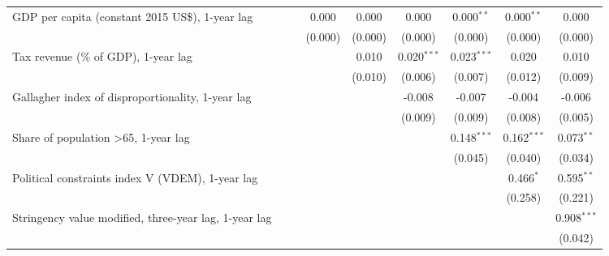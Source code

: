 \begin{table}[htbp]
\begin{tabular}{lcccccccc}
      GDP per capita (constant 2015 US\$), 1-year lag                     &              &              & 0.000       & 0.000   & 0.000         & 0.000$^{**}$  & 0.000$^{**}$  & 0.000\\   
                                                                          &              &              & (0.000)     & (0.000) & (0.000)       & (0.000)       & (0.000)       & (0.000)\\   
      Tax revenue (\% of GDP), 1-year lag                                 &              &              &             & 0.010   & 0.020$^{***}$ & 0.023$^{***}$ & 0.020         & 0.010\\   
                                                                          &              &              &             & (0.010) & (0.006)       & (0.007)       & (0.012)       & (0.009)\\   
      Gallagher index of disproportionality, 1-year lag                   &              &              &             &         & -0.008        & -0.007        & -0.004        & -0.006\\   
                                                                          &              &              &             &         & (0.009)       & (0.009)       & (0.008)       & (0.005)\\   
      Share of population >65, 1-year lag                                 &              &              &             &         &               & 0.148$^{***}$ & 0.162$^{***}$ & 0.073$^{**}$\\   
                                                                          &              &              &             &         &               & (0.045)       & (0.040)       & (0.034)\\   
      Political constraints index V (VDEM), 1-year lag                    &              &              &             &         &               &               & 0.466$^{*}$   & 0.595$^{**}$\\   
                                                                          &              &              &             &         &               &               & (0.258)       & (0.221)\\   
      Stringency value modified, three-year lag, 1-year lag               &              &              &             &         &               &               &               & 0.908$^{***}$\\   
                                                                          &              &              &             &         &               &               &               & (0.042)\\   

\end{tabular}
\end{table}
